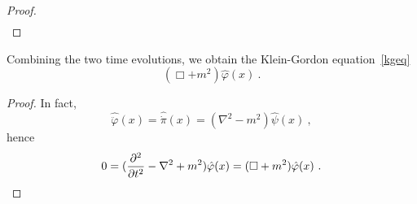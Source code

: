 \begin{proof}
\begin{equation*}
\begin{aligned}
        \end{aligned}
        \end{equation*}
    \end{proof}

    Combining the two time evolutions, we obtain the Klein-Gordon equation~\eqref{kgeq}
    \begin{equation*}
        (\Box + m^2) \hat \varphi (x) ~.
    \end{equation*}
    \begin{proof}
        In fact, 
        \begin{equation*}
            \hat{\ddot \varphi} (x) =  \hat{\dot \pi} (x) = (\nabla^2 - m^2) \hat \psi(x) ~,
        \end{equation*}
        hence
        \begin{equation*}
            0 = (\frac{\partial^2 }{\partial t^2} - \nabla^2 + m^2) \hat \varphi (x) = (\Box + m^2) \hat \varphi (x) ~.
        \end{equation*}
    \end{proof}

